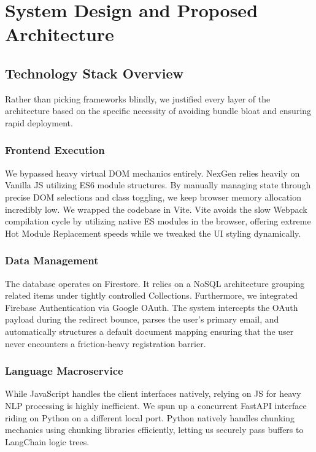 \documentclass[12pt,a4paper]{report}
\begin{document}
\chapter{System Design and Proposed Architecture}

\section{Technology Stack Overview}
Rather than picking frameworks blindly, we justified every layer of the architecture based on the specific necessity of avoiding bundle bloat and ensuring rapid deployment.

\subsection{Frontend Execution}
We bypassed heavy virtual DOM mechanics entirely. NexGen relies heavily on Vanilla JS utilizing ES6 module structures. By manually managing state through precise DOM selections and class toggling, we keep browser memory allocation incredibly low. We wrapped the codebase in Vite. Vite avoids the slow Webpack compilation cycle by utilizing native ES modules in the browser, offering extreme Hot Module Replacement speeds while we tweaked the UI styling dynamically.

\subsection{Data Management}
The database operates on Firestore. It relies on a NoSQL architecture grouping related items under tightly controlled Collections. Furthermore, we integrated Firebase Authentication via Google OAuth. The system intercepts the OAuth payload during the redirect bounce, parses the user's primary email, and automatically structures a default document mapping ensuring that the user never encounters a friction-heavy registration barrier.

\subsection{Language Macroservice}
While JavaScript handles the client interfaces natively, relying on JS for heavy NLP processing is highly inefficient. We spun up a concurrent FastAPI interface riding on Python on a different local port. Python natively handles chunking mechanics using chunking libraries efficiently, letting us securely pass buffers to LangChain logic trees.
\end{document}
